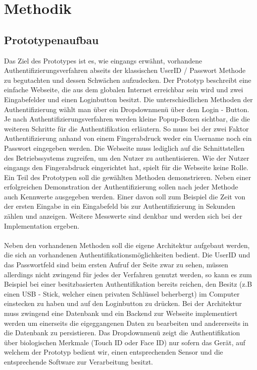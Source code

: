 \chapter{Methodik}
\section{Prototypenaufbau}
Das Ziel des Prototypes ist es, wie eingangs erwähnt, vorhandene Authentifizierungsverfahren abseits der klassischen UserID / Passwort Methode zu begutachten und dessen Schwächen aufzudecken. Der Prototyp beschreibt eine einfache Webseite, die aus dem globalen Internet erreichbar sein wird und zwei Eingabefelder und einen Loginbutton besitzt. Die unterschiedlichen Methoden der Authentifizierung wählt man über ein Dropdownmenü über dem Login - Button. Je nach Authentifizierungsverfahren werden kleine Popup-Boxen sichtbar, die die weiteren Schritte für die Authentifikation erläutern. So muss bei der zwei Faktor Authentifizierung anhand von einem Fingerabdruck weder ein Username noch ein Passwort eingegeben werden. Die Webseite muss lediglich auf die Schnittstellen des Betriebssystems zugreifen, um den Nutzer zu authentisieren. Wie der Nutzer eingangs den Fingerabdruck eingerichtet hat, spielt für die Webseite keine Rolle.
Ein Teil des Prototypen soll die gewählten Methoden demonstrieren. Neben einer erfolgreichen Demonstration der Authentifizierung sollen nach jeder Methode auch Kennwerte ausgegeben werden. Einer davon soll zum Beispiel die Zeit von der ersten Eingabe in ein Eingabefeld bis zur Authentifizierung in Sekunden zählen und anzeigen. Weitere Messwerte sind denkbar und werden sich bei der Implementation ergeben. \\
\\
Neben den vorhandenen Methoden soll die eigene Architektur aufgebaut werden, die sich an vorhandenen Authentifikationsmöglichkeiten bedient. Die UserID und das Passwortfeld sind beim ersten Aufruf der Seite zwar zu sehen, müssen allerdings nicht zwingend für jedes der Verfahren genutzt werden, so kann es zum Beispiel bei einer besitzbasierten Authentifikation bereits reichen, den Besitz (z.B einen USB - Stick, welcher einen privaten Schlüssel beherbergt) im Computer einstecken zu haben und auf den Loginbutton zu drücken. Bei der Architektur muss zwingend eine Datenbank und ein Backend zur Webseite implementiert werden um einerseits die eigeggangenen Daten zu bearbeiten und andererseits in die Datenbank zu persistieren. Das Dropdownmenü zeigt die Authentifikation über biologischen Merkmale (Touch ID oder Face ID) nur sofern das Gerät, auf welchem der Prototyp bedient wir, einen entsprechenden Sensor und die entsprechende Software zur Verarbeitung besitzt.

